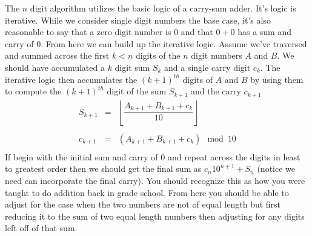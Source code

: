 \documentclass[10pt]{article}
\begin{document}
The $n$ digit algorithm utilizes the basic logic of a carry-sum adder. It's logic is iterative. While we consider single digit numbers the base case, it's also reasonable to say that a zero digit number is $0$ and that $0+0$ has a sum and carry of $0$. From here we can build up the iterative logic. Assume we've traversed and summed across the first $k < n$ digits of the $n$ digit numbers $A$ and $B$. We should have accumulated a $k$ digit sum $S_k$ and a single carry digit $c_k$. The iterative logic then accumulates the $(k+1)^{th}$ digits of $A$ and $B$ by using them to compute the $(k+1)^{th}$ digit of the sum $S_{k+1}$ and the carry $c_{k+1}$
\[
\begin{array}{rcl}
S_{k+1} &=& \left\lfloor \dfrac{A_{k+1} + B_{k+1} + c_k}{10} \right\rfloor \\ \\
c_{k+1} &=& (A_{k+1} + B_{k+1} + c_k) \mod 10 \\
\end{array}
\]
If begin with the initial sum and carry of $0$ and repeat across the digits in least to greatest order then we should get the final sum as $c_n10^{n+1}+S_n$ (notice we need can incorporate the final carry). You should recognize this as how you were taught to do addition back in grade school. From here you should be able to adjust for the case when the two numbers are not of equal length but first reducing it to the sum of two equal length numbers then adjusting for any digits left off of that sum. 

%
%
\end{document}
